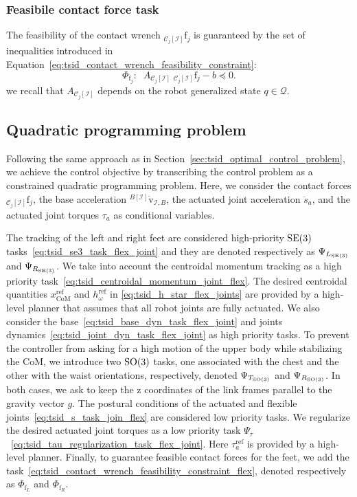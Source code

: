 \subsubsection{Feasibile contact force task}
The feasibility of the contact wrench ${}_{\mathcal{C}_j[\mathcal{I}]}\mathrm{f}_j$ is guaranteed by the set of inequalities introduced in Equation~\eqref{eq:tsid_contact_wrench_feasibility_constraint}:
\begin{equation}
  \Phi_{\mathrm{f}_j}: \;\;  \label{eq:tsid_contact_wrench_feasibility_constraint_flex}
    A_{\mathcal{C}_j[\mathcal{I}]} \; {}_{\mathcal{C}_j[\mathcal{I}]}\mathrm{f}_j - b  \preceq 0.
\end{equation}
we recall that $A_{\mathcal{C}_j[\mathcal{I}]}$ depends on the robot generalized state $q\in \mathcal{Q}$.

\subsection{Quadratic programming problem \label{sec:joint_flex_optimal_control}}
Following the same approach as in Section~\ref{sec:tsid_optimal_control_problem}, we achieve the
control objective by transcribing the control problem as a constrained quadratic programming problem. Here, we consider the contact forces ${}_{\mathcal{C}_j[\mathcal{I}]}\mathrm{f}_j$, the base acceleration ${}^{B[\mathcal{I}]} \dot{\mathrm{v}}_{\mathcal{I}, B}$, the actuated joint acceleration $\ddot{s}_a$, and the actuated joint torques $\tau_a$ as conditional variables.
\par
The tracking of the left and right feet are considered high-priority ${\mathrm{SE}}(3)$ tasks~\eqref{eq:tsid_se3_task_flex_joint} and they are denoted respectively as $\Psi_{L_{{\mathrm{SE}}(3)}}$ and $\Psi_{R_{{\mathrm{SE}}(3)}}$. We take into account the centroidal momentum tracking as a high priority task~\eqref{eq:tsid_centroidal_momentum_joint_flex}. The desired centroidal quantities $x_\text{CoM}^\text{ref}$ and $h_\omega^\text{ref}$ in \eqref{eq:tsid_h_star_flex_joints} are provided by a high-level planner that assumes that all robot joints are fully actuated. We also consider the base~\eqref{eq:tsid_base_dyn_task_flex_joint} and joints dynamics~\eqref{eq:tsid_joint_dyn_task_flex_joint} as high priority tasks. To prevent the controller from asking for a high motion of the upper body while stabilizing the CoM, we introduce two $\mathrm{SO}(3)$ tasks, one associated with the chest and the other with the waist orientations, respectively, denoted $\Psi_{T_{\mathrm{SO}(3)}}$ and $\Psi_{R_{\mathrm{SO}(3)}}$. In both cases, we ask to keep the z coordinates of the link frames parallel to the gravity vector $g$. The postural conditions of the actuated and flexible joints~\eqref{eq:tsid_s_task_join_flex} are considered low priority tasks.  We regularize the desired actuated joint torques as a low priority task $\Psi_\tau$~\eqref{eq:tsid_tau_regularization_task_flex_joint}. Here $\tau^\text{ref}_a$ is provided by a high-level planner. Finally, to guarantee feasible contact forces for the feet, we add the task~\eqref{eq:tsid_contact_wrench_feasibility_constraint_flex}, denoted respectively as $\Phi_{\mathrm{f}_L}$ and $\Phi_{\mathrm{f}_R}$.
